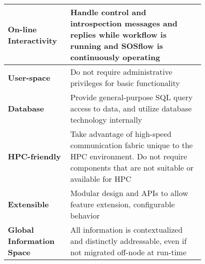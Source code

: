 \begin{table*}[t]
\begin{tabular}{|p{0.2\linewidth}|p{0.6\linewidth}|}
\hline %
%
\textbf{On-line Interactivity}
&
Handle control and introspection messages and replies while
workflow is running and SOSflow is continuously operating
\\
%
%
\hline %
%
\textbf{User-space}
&
Do not require administrative privileges for basic functionality
\\
%
%
\hline %
%
\textbf{Database}
&
Provide general-purpose SQL query access to data, and utilize
database technology internally
\\
%
%
\hline %
%
\textbf{HPC-friendly}
&
Take advantage of high-speed communication fabric unique to the
HPC environment.  Do not require components that are not suitable or
available for HPC
\\
%
%
\hline %
%
\textbf{Extensible}
&
Modular design and APIs to allow feature extension, configurable
behavior
\\
%
%
\hline %
%
\textbf{Global Information Space}
&
All information is contextualized and distinctly addressable, even
if not migrated off-node at run-time
\\
%
%
\hline %
\end{tabular}
\end{table*}


